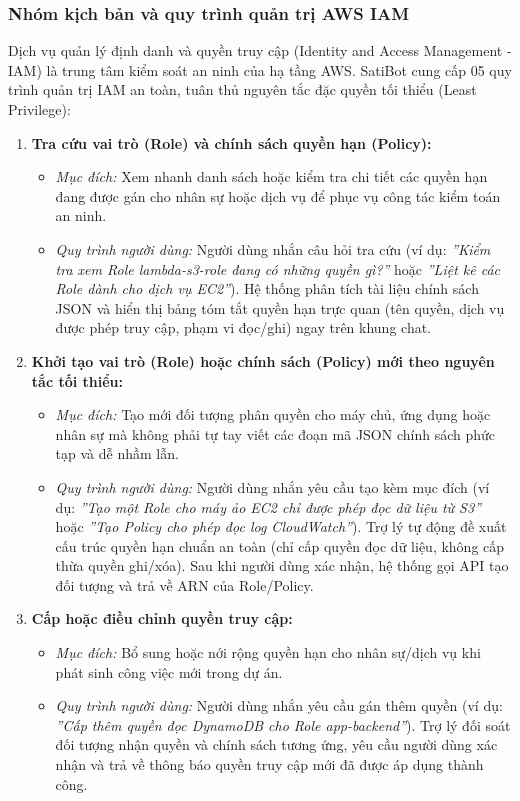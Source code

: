 \documentclass[a4paper,12pt]{article}
\begin{document}
\subsubsection{Nhóm kịch bản và quy trình quản trị AWS IAM}

Dịch vụ quản lý định danh và quyền truy cập (Identity and Access Management - IAM) là trung tâm kiểm soát an ninh của hạ tầng AWS. SatiBot cung cấp 05 quy trình quản trị IAM an toàn, tuân thủ nguyên tắc đặc quyền tối thiểu (Least Privilege):

\begin{enumerate}
  \item \textbf{Tra cứu vai trò (Role) và chính sách quyền hạn (Policy):}
  \begin{itemize}
    \item \textit{Mục đích:} Xem nhanh danh sách hoặc kiểm tra chi tiết các quyền hạn đang được gán cho nhân sự hoặc dịch vụ để phục vụ công tác kiểm toán an ninh.
    \item \textit{Quy trình người dùng:} Người dùng nhắn câu hỏi tra cứu (ví dụ: \textit{''Kiểm tra xem Role lambda-s3-role đang có những quyền gì?''} hoặc \textit{''Liệt kê các Role dành cho dịch vụ EC2''}). Hệ thống phân tích tài liệu chính sách JSON và hiển thị bảng tóm tắt quyền hạn trực quan (tên quyền, dịch vụ được phép truy cập, phạm vi đọc/ghi) ngay trên khung chat.
  \end{itemize}

  \item \textbf{Khởi tạo vai trò (Role) hoặc chính sách (Policy) mới theo nguyên tắc tối thiểu:}
  \begin{itemize}
    \item \textit{Mục đích:} Tạo mới đối tượng phân quyền cho máy chủ, ứng dụng hoặc nhân sự mà không phải tự tay viết các đoạn mã JSON chính sách phức tạp và dễ nhầm lẫn.
    \item \textit{Quy trình người dùng:} Người dùng nhắn yêu cầu tạo kèm mục đích (ví dụ: \textit{''Tạo một Role cho máy ảo EC2 chỉ được phép đọc dữ liệu từ S3''} hoặc \textit{''Tạo Policy cho phép đọc log CloudWatch''}). Trợ lý tự động đề xuất cấu trúc quyền hạn chuẩn an toàn (chỉ cấp quyền đọc dữ liệu, không cấp thừa quyền ghi/xóa). Sau khi người dùng xác nhận, hệ thống gọi API tạo đối tượng và trả về ARN của Role/Policy.
  \end{itemize}

  \item \textbf{Cấp hoặc điều chỉnh quyền truy cập:}
  \begin{itemize}
    \item \textit{Mục đích:} Bổ sung hoặc nới rộng quyền hạn cho nhân sự/dịch vụ khi phát sinh công việc mới trong dự án.
    \item \textit{Quy trình người dùng:} Người dùng nhắn yêu cầu gán thêm quyền (ví dụ: \textit{''Cấp thêm quyền đọc DynamoDB cho Role app-backend''}). Trợ lý đối soát đối tượng nhận quyền và chính sách tương ứng, yêu cầu người dùng xác nhận và trả về thông báo quyền truy cập mới đã được áp dụng thành công.
  \end{itemize}


\end{enumerate}
\end{document}
